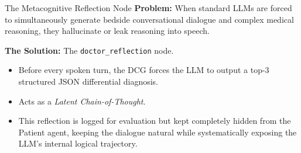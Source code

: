 \documentclass[10pt, aspectratio=169]{beamer}
\begin{document}
\begin{frame}{The Metacognitive Reflection Node}
    \textbf{Problem:} When standard LLMs are forced to simultaneously generate bedside conversational dialogue and complex medical reasoning, they hallucinate or leak reasoning into speech.
    
    \vspace{0.3cm}
    \textbf{The Solution:} The \texttt{doctor\_reflection} node.
    \begin{itemize}
        \item Before every spoken turn, the DCG forces the LLM to output a top-3 structured JSON differential diagnosis.
        \item Acts as a \textit{Latent Chain-of-Thought}.
        \item This reflection is logged for evaluation but kept completely hidden from the Patient agent, keeping the dialogue natural while systematically exposing the LLM's internal logical trajectory.
    \end{itemize}
\end{frame}
\end{document}
